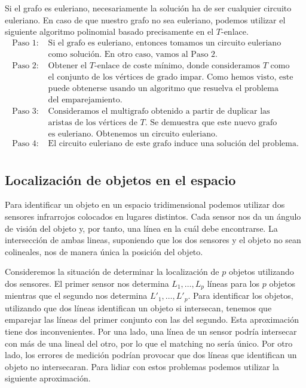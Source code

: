 \documentclass[twoside,a4paper,openright,12pt,tikz]{book}
\begin{document}
Si el grafo es euleriano, necesariamente la solución ha de ser cualquier circuito euleriano. En caso de que nuestro grafo no sea euleriano, podemos utilizar el siguiente algoritmo polinomial basado precisamente en el $T$-enlace.
\begin{align*}
\text{Paso 1: }& \text{Si el grafo es euleriano, entonces tomamos un circuito euleriano}\\
&\text{como solución. En otro caso, vamos al Paso 2.}\\
\text{Paso 2: }&\text{Obtener el $T$-enlace de coste mínimo, donde consideramos $T$ como}\\
&\text{el conjunto de los vértices de grado impar. Como hemos visto, este}\\
&\text{puede obtenerse usando un algoritmo que resuelva el problema}\\
&\text{del emparejamiento.}\\
\text{Paso 3: }&\text{Consideramos el multigrafo obtenido a partir de duplicar las}\\
&\text{aristas de los vértices de $T$. Se demuestra que este nuevo grafo}\\
&\text{es euleriano. Obtenemos un circuito euleriano.}\\
\text{Paso 4: }& \text{El circuito euleriano de este grafo induce una solución del problema.}\\
\end{align*} 

\subsection{Localización de objetos en el espacio}
Para identificar un objeto en un espacio tridimensional podemos utilizar dos sensores infrarrojos colocados en lugares distintos. Cada sensor nos da un ángulo de visión del objeto y, por tanto, una línea en la cuál debe encontrarse. La intersección de ambas lineas, suponiendo que los dos sensores y el objeto no sean colineales, nos de manera única la posición del objeto. 

Consideremos la situación de determinar la localización de $p$ objetos utilizando dos sensores. El primer sensor nos determina $L_1,\dotsc,L_p$ líneas para los $p$ objetos mientras que el segundo nos determina $L'_1,\dotsc,L'_p$. Para identificar los objetos, utilizando que dos líneas identifican un objeto si intersecan, tenemos que emparejar las líneas del primer conjunto con las del segundo. Esta aproximación tiene dos inconvenientes. Por una lado, una línea de un sensor podría intersecar con más de una lineal del otro, por lo que el matching no sería único. Por otro lado, los errores de medición podrían provocar que dos líneas que identifican un objeto no intersecaran. Para lidiar con estos problemas podemos utilizar la siguiente aproximación. 
\end{document}
